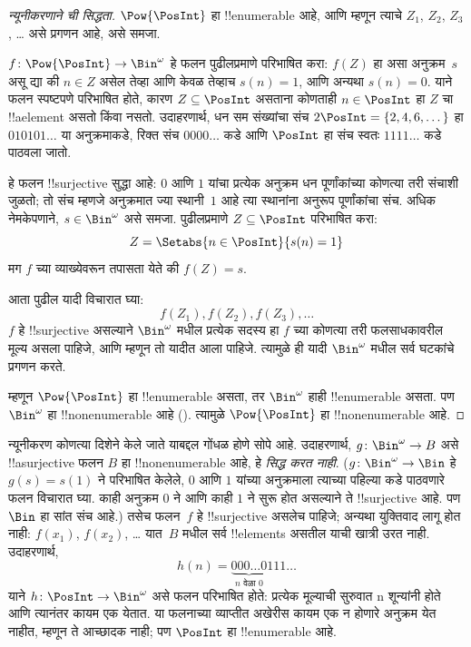 \documentclass[../../../include/open-logic-section]{subfiles}
\begin{document}
\begin{proof}[न्यूनीकरणाने {} ची सिद्धता]
$\Pow{\PosInt}$ हा !!{enumerable} आहे, आणि म्हणून त्याचे $Z_{1}$,
$Z_{2}$, $Z_{3}$, \dots{} असे प्रगणन आहे, असे समजा.

$f \colon \Pow{\PosInt} \to \Bin^\omega$ हे फलन पुढीलप्रमाणे परिभाषित
करा: $f(Z)$ हा असा अनुक्रम~$s$ असू द्या की $n \in Z$ असेल तेव्हा
आणि केवळ तेव्हाच $s(n) = 1$, आणि अन्यथा $s(n) = 0$. याने
फलन स्पष्टपणे परिभाषित होते, कारण $Z \subseteq \PosInt$ असताना कोणताही
$n \in \PosInt$ हा $Z$ चा !!a{element} असतो किंवा नसतो. उदाहरणार्थ, धन सम संख्यांचा संच
$2\PosInt = \{2, 4, 6, \dots\}$ हा $010101\dots$ या अनुक्रमाकडे,
रिक्त संच $0000\dots$ कडे आणि $\PosInt$ हा संच स्वतः $1111\dots$ कडे
पाठवला जातो.
%

हे फलन !!{surjective} सुद्धा आहे: $0$ आणि $1$ यांचा प्रत्येक अनुक्रम धन
पूर्णांकांच्या कोणत्या तरी संचाशी जुळतो; तो संच म्हणजे अनुक्रमात ज्या
स्थानी~$1$ आहे त्या स्थानांना अनुरूप पूर्णांकांचा संच. अधिक नेमकेपणाने,
$s \in \Bin^\omega$ असे समजा. पुढीलप्रमाणे $Z \subseteq \PosInt$
परिभाषित करा:
\[
Z = \Setabs{n \in \PosInt}{s(n) = 1}
\]
मग $f$ च्या व्याख्येवरून तपासता येते की $f(Z) = s$.

आता पुढील यादी विचारात घ्या:
\[
f(Z_1), f(Z_2), f(Z_3), \dots
\]
$f$ हे !!{surjective} असल्याने $\Bin^\omega$ मधील प्रत्येक सदस्य हा
$f$ च्या कोणत्या तरी फलसाधकावरील मूल्य असला पाहिजे, आणि म्हणून तो
यादीत आला पाहिजे. त्यामुळे ही यादी $\Bin^\omega$ मधील सर्व घटकांचे
प्रगणन करते.

म्हणून $\Pow{\PosInt}$ हा !!{enumerable} असता, तर $\Bin^\omega$ हाही
!!{enumerable} असता. पण $\Bin^\omega$ हा !!{nonenumerable} आहे
(). त्यामुळे $\Pow{\PosInt}$ हा
!!{nonenumerable} आहे.
\end{proof}

\begin{explain}
न्यूनीकरण कोणत्या दिशेने केले जाते याबद्दल गोंधळ होणे सोपे आहे.
उदाहरणार्थ, $g \colon \Bin^\omega \to B$ असे !!a{surjective} फलन
$B$ हा !!{nonenumerable} आहे, हे \emph{सिद्ध करत नाही}. ($g
\colon \Bin^\omega \to \Bin$ हे $g(s) = s(1)$ ने परिभाषित केलेले,
$0$ आणि $1$ यांच्या अनुक्रमाला त्याच्या पहिल्या कडे
पाठवणारे फलन विचारात घ्या. काही अनुक्रम $0$ ने आणि काही $1$ ने सुरू
होत असल्याने ते !!{surjective} आहे. पण $\Bin$ हा सांत संच आहे.)
तसेच फलन~$f$ हे !!{surjective} असलेच पाहिजे; अन्यथा युक्तिवाद लागू
होत नाही: $f(x_1)$, $f(x_2)$, \dots{} यात~$B$ मधील सर्व !!{element}s
असतील याची खात्री उरत नाही. उदाहरणार्थ,
\[
h(n) = \underbrace{000\dots0}_{\text{$n$ वेळा $0$}}111\dots
\]
याने $h\colon \PosInt \to
\Bin^\omega$ असे फलन परिभाषित होते: प्रत्येक मूल्याची सुरुवात n शून्यांनी
होते आणि त्यानंतर कायम एक येतात. या फलनाच्या व्याप्तीत अखेरीस कायम एक
न होणारे अनुक्रम येत नाहीत, म्हणून ते आच्छादक नाही; पण $\PosInt$ हा
!!{enumerable} आहे.
%
\end{explain}
\end{document}
